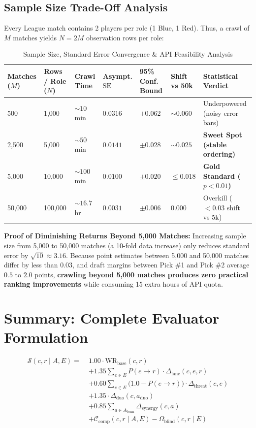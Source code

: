 \documentclass[11pt,a4paper]{article}
\begin{document}
\subsection{Sample Size Trade-Off Analysis}
Every League match contains 2 players per role (1 Blue, 1 Red). Thus, a crawl of $M$ matches yields $N = 2M$ observation rows per role:

\begin{table}[h]
\centering
\caption{Sample Size, Standard Error Convergence \& API Feasibility Analysis}
\label{tab:sample_size}
\small
\begin{tabular}{lllllll}
\toprule
\textbf{Matches ($M$)} & \textbf{Rows / Role ($N$)} & \textbf{Crawl Time} & \textbf{Asympt. $\text{SE}$} & \textbf{95\% Conf. Bound} & \textbf{Shift vs 50k} & \textbf{Statistical Verdict} \\
\midrule
500 & 1,000 & $\sim 10$ min & $0.0316$ & $\pm 0.062$ & $\sim 0.060$ & Underpowered (noisy error bars) \\
2,500 & 5,000 & $\sim 50$ min & $0.0141$ & $\pm 0.028$ & $\sim 0.025$ & \textbf{Sweet Spot (stable ordering)} \\
5,000 & 10,000 & $\sim 100$ min & $0.0100$ & $\pm 0.020$ & $\le 0.018$ & \textbf{Gold Standard ($p < 0.01$)} \\
50,000 & 100,000 & $\sim 16.7$ hr & $0.0031$ & $\pm 0.006$ & $0.000$ & Overkill ($< 0.03$ shift vs 5k) \\
\bottomrule
\end{tabular}
\end{table}

\noindent \textbf{Proof of Diminishing Returns Beyond 5,000 Matches:} Increasing sample size from 5,000 to 50,000 matches (a 10-fold data increase) only reduces standard error by $\sqrt{10} \approx 3.16$. Because point estimates between 5,000 and 50,000 matches differ by less than $0.03$, and draft margins between Pick \#1 and Pick \#2 average $0.5$ to $2.0$ points, \textbf{crawling beyond 5,000 matches produces zero practical ranking improvements} while consuming 15 extra hours of API quota.

\section{Summary: Complete Evaluator Formulation}
\begin{equation}
\boxed{
\begin{aligned}
\mathcal{S}(c, r \mid A, E) =\; & 1.00 \cdot \text{WR}_{\text{base}}(c, r) \\
& + 1.35 \sum_{e \in E} P(e \to r) \cdot \Delta_{\text{lane}}(c, e, r) \\
& + 0.60 \sum_{e \in E} \big(1.0 - P(e \to r)\big) \cdot \Delta_{\text{threat}}(c, e) \\
& + 1.35 \cdot \Delta_{\text{duo}}(c, a_{\text{duo}}) \\
& + 0.85 \sum_{a \in A_{\text{team}}} \Delta_{\text{synergy}}(c, a) \\
& + \mathcal{C}_{\text{comp}}(c, r \mid A, E) - \Omega_{\text{blind}}(c, r \mid E)
\end{aligned}
}
\end{equation}
\end{document}
